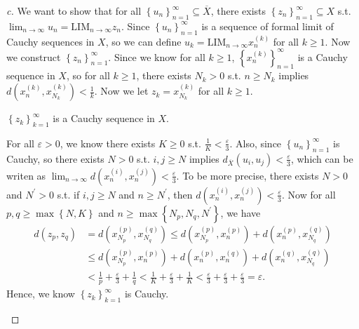 \begin{proof}[c]
  We want to show that for all \(\left\{ u_n \right\}_{n=1}^{\infty}  \subseteq \overline{X}  \), there exists \(\left\{ z_n \right\}_{n=1}^{\infty} \subseteq X \) s.t. \(\lim_{n \to \infty} u_n = \mathrm{LIM}_{n \to \infty } z_n \). Since \(\left\{ u_n \right\}_{n=1}^{\infty } \) is a sequence of formal limit of Cauchy sequences in \(X\), so we can define \(u_k = \mathrm{LIM}_{n \to \infty } x_n^{(k)} \) for all \(k \ge 1\). Now we construct \(\left\{ z_n \right\}_{n=1}^{\infty}  \). Since we know for all \(k \ge 1\), \(\left\{ x^{(k)}_n \right\}_{n=1}^{\infty}  \) is a Cauchy sequence in \(X\), so for all \(k \ge 1\), there exists \(N_k > 0\) s.t. \(n \ge N_k\) implies \(d\left( x_n^{(k)}, x_{N_k}^{(k)} \right) < \frac{1}{k} \). Now we let \(z_k = x_{N_k}^{(k)}\) for all \(k \ge 1\). 
  \begin{claim} \label{clm: zk Cauchy}
    \(\left\{ z_k \right\}_{k=1}^{\infty}  \) is a Cauchy sequence in \(X\).  
  \end{claim} 
  \begin{explanation}
    For all \(\varepsilon > 0\), we know there exists \(K \ge 0\) s.t. \(\frac{1}{K} < \frac{\varepsilon}{3}\). Also, since \(\left\{ u_n \right\}_{n=1}^{\infty}  \) is Cauchy, so there exists \(N > 0\) s.t. \(i, j \ge N\) implies \(d_{\overline{X} }(u_i, u_j) < \frac{\varepsilon}{3} \), which can be writen as \(\lim_{n \to \infty} d\left( x_n^{(i)}, x_n^{(j)} \right) < \frac{\varepsilon}{3}  \). To be more precise, there exists \(N > 0\) and \(N^{\prime}  > 0\) s.t. if \(i, j \ge N\) and \(n \ge N^{\prime} \), then \(d\left( x_n^{(i)}, x_n^{(j)} \right) < \frac{\varepsilon}{3} \). Now for all \(p, q \ge \max \left\{ N, K \right\} \) and \(n \ge \max \left\{ N_p, N_q, N^{\prime}  \right\} \), we have 
    \begin{align*}
       d(z_p, z_q ) &= d\left( x_{N_p}^{(p)}, x_{N_q}^{(q)} \right) \le d\left( x_{N_p}^{(p)}, x_n^{(p)} \right) + d\left( x_n^{(p)}, x_{N_q}^{(q)} \right) \\
       &\le d\left( x_{N_p}^{(p)}, x_n^{(p)} \right) + d\left( x_n^{(p)}, x_n^{(q)} \right) + d\left( x_n^{(q)}, x_{N_q}^{(q)} \right) \\
       &< \frac{1}{p} + \frac{\varepsilon}{3} + \frac{1}{q} < \frac{1}{K} + \frac{\varepsilon}{3} + \frac{1}{K} < \frac{\varepsilon}{3} + \frac{\varepsilon}{3} + \frac{\varepsilon}{3} = \varepsilon.  
    \end{align*}    
    Hence, we know \(\left\{ z_k \right\}_{k=1}^{\infty}  \) is Cauchy.           
  \end{explanation}


\end{proof}
